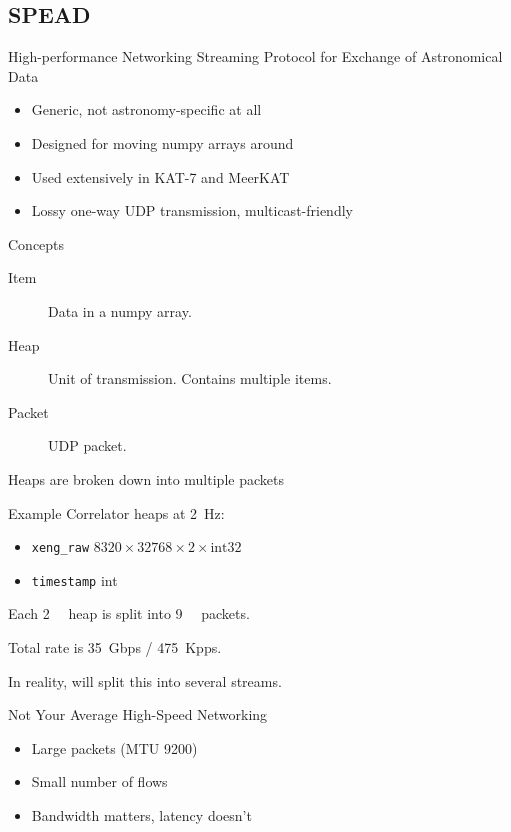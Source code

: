\documentclass{beamer}
\begin{document}
\subsection{SPEAD}

\begin{frame}{High-performance Networking}
  \alert{S}treaming \alert{P}rotocol for \alert{E}xchange of
  \alert{A}stronomical \alert{D}ata
  \begin{itemize}
    \item Generic, not astronomy-specific at all
    \item Designed for moving numpy arrays around
    \item Used extensively in KAT-7 and MeerKAT
    \item Lossy one-way UDP transmission, multicast-friendly
  \end{itemize}
\end{frame}

\begin{frame}{Concepts}
  \begin{description}
    \item[Item] Data in a numpy array.
    \item[Heap] Unit of transmission. Contains multiple items.
    \item[Packet] UDP packet.
  \end{description}
  Heaps are broken down into multiple packets
\end{frame}

\begin{frame}{Example}
  Correlator heaps at \SI{2}{\Hz}:
  \begin{itemize}
    \item \texttt{xeng_raw} $8320\times 32768\times 2\times \text{int32}$
    \item \texttt{timestamp} int
  \end{itemize}
  Each \SI{2}{\gibi\byte} heap is split into \SI{9}{\kilo\byte} packets.

  \pause
  Total rate is \SI{35}{Gbps} / \SI{475}{Kpps}.

  \pause
  In reality, will split this into several streams.
\end{frame}

\begin{frame}{Not Your Average High-Speed Networking}
  \begin{itemize}
    \item Large packets (MTU 9200)
    \item Small number of flows
    \item Bandwidth matters, latency doesn't
  \end{itemize}
\end{frame}
\end{document}
